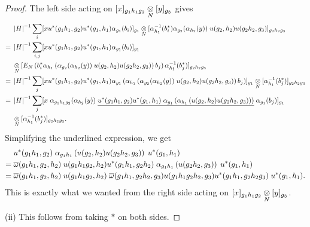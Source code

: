 \begin{proof}
The left side acting on $ [x]_{g_1 h_1 g_2} \underset{N}{\otimes} [y]_{g_3}$ gives
\begin{align*}
& \; \left|{H}\right |^{-1} \underset{i}{\sum} [x u^*(g_1 h_1 ,g_2) u^* (g_1, h_1) \alpha_{g_1} (b_i)]_{g_1} \underset{N}{\otimes} [\alpha^{-1}_{h_1} (b^*_i) \alpha_{g_2} (\alpha_{h_2} (y))\;  u(g_2 , h_2) u(g_2 h_2 , g_3) ]_{g_2h_2 g_3}\\
=& \; \left|{H}\right |^{-1} \underset{i,j}{\sum} [x u^*(g_1 h_1 ,g_2) u^* (g_1, h_1) \alpha_{g_1} (b_i)]_{g_1}\\
& \; \underset{N}{\otimes} [E_N \left(b^*_i \alpha_{h_1}  \left(\alpha_{g_2} (\alpha_{h_2} (y))\;  u(g_2 , h_2) u(g_2 h_2 , g_3)\right) b_j \right) \alpha^{-1}_{h_1} (b^*_j)]_{g_2h_2 g_3}\\
=& \; \left|{H}\right |^{-1} \underset{j}{\sum} [x u^*(g_1 h_1 ,g_2) u^* (g_1, h_1) \alpha_{g_1} \left(\alpha_{h_1}  \left(\alpha_{g_2} (\alpha_{h_2} (y))\;  u(g_2 , h_2) u(g_2 h_2 , g_3)\right) b_j \right)]_{g_1} \underset{N}{\otimes} [\alpha^{-1}_{h_1} (b^*_j)]_{g_2h_2 g_3}\\
=& \; \left|{H}\right |^{-1} \underset{j}{\sum} [x \; \alpha_{g_1h_1g_2} (\alpha_{h_2} (y)) \; \underline{u^*(g_1 h_1 ,g_2) u^* (g_1, h_1) \; \alpha_{g_1} \left( \alpha_{h_1} \left(  u(g_2 , h_2) u(g_2 h_2 , g_3) \right)  \right)} \; \alpha_{g_1} (b_j)]_{g_1}\\
& \; \underset{N}{\otimes} [\alpha^{-1}_{h_1} (b^*_j)]_{g_2h_2 g_3}.
\end{align*}
Simplifying the underlined expression, we get
\begin{align*}
& \; u^*(g_1 h_1 ,g_2)  \; \alpha_{g_1 h_1}  \left(  u(g_2 , h_2) u(g_2 h_2 , g_3) \right) \; u^* (g_1, h_1)\\
= & \; \overline{\omega}(g_1h_1, g_2 , h_2)  \; u(g_1 h_1 g_2 , h_2) u^* (g_1 h_1,g_2h_2) \; \alpha_{g_1 h_1}  \left( u(g_2 h_2 , g_3) \right) \; u^* (g_1, h_1)\\
= & \; \overline{\omega}(g_1h_1, g_2 , h_2) \; u(g_1 h_1 g_2 , h_2) \; \overline{\omega} (g_1h_1 ,g_2 h_2, g_3) u(g_1h_1g_2h_2 , g_3) u^*(g_1h_1, g_2h_2g_3) \; u^* (g_1, h_1).
\end{align*}
This is exactly what we wanted from the right side acting on $ [x]_{g_1 h_1 g_2} \underset{N}{\otimes} [y]_{g_3}$.

(ii) This follows from taking $ * $ on both sides.
\end{proof}